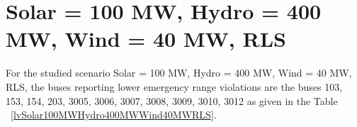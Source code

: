 \documentclass[10pt]{report}
\begin{document}
\section{Solar = 100 MW, Hydro = 400 MW, Wind = 40 MW, RLS}
For the studied scenario Solar = 100 MW, Hydro = 400 MW, Wind = 40 MW, RLS, the buses reporting lower emergency range violations are the buses 103, 153, 154, 203, 3005, 3006, 3007, 3008, 3009, 3010, 3012 as given in the Table ~\ref{lvSolar100MWHydro400MWWind40MWRLS}.
\begin{table}[H]
\caption{Contingencies reporting bus voltages lower than emergency voltage of 1.1 PU for scenario Solar = 100 MW, Hydro = 400 MW, Wind = 40 MW, RLS}
\label{lvSolar100MWHydro400MWWind40MWRLS}
\centering
{}
\end{table}
\end{document}

